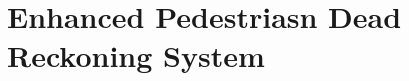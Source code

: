 \documentclass[engproc,conferenceproceedings,submit,pdftex,moreauthors]{Definitions/mdpi}
\begin{document}




\section{Enhanced Pedestriasn Dead Reckoning System}

	
\end{document}
